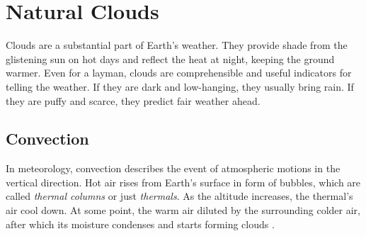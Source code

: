 \section{Natural Clouds}
Clouds are a substantial part of Earth's weather. They provide shade from the glistening sun on hot days and reflect the heat at night, keeping the ground warmer.
Even for a layman, clouds are comprehensible and useful indicators for telling the weather.
If they are dark and low-hanging, they usually bring rain.
If they are puffy and scarce, they predict fair weather ahead.

\subsection{Convection}
\label{section:clouds:convection}
In meteorology, \gls{convection} describes the event of atmospheric motions in the vertical direction.
Hot air rises from Earth's surface in form of bubbles, which are called \emph{\gls{thermal} columns} or just \emph{\gls{thermal}s}.
As the \gls{altitude} increases, the \gls{thermal}'s air cool down. At some point, the warm air diluted by the surrounding colder air, after which its moisture condenses and starts forming clouds \cite{weather:convection}.

\begin{figure}[H]
    \centering
    \label{img:tikz:convection}
\end{figure}

